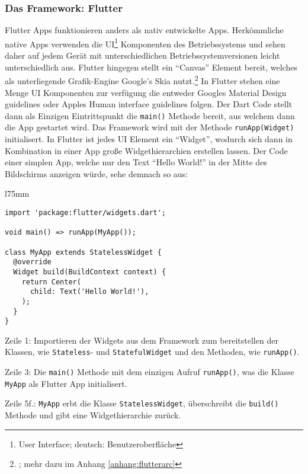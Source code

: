 \subsubsection{Das Framework: Flutter}

Flutter Apps funktionieren anders als nativ entwickelte Apps. Herkömmliche native Apps verwenden die UI\footnote{User Interface; deutsch: Benutzeroberfläche} Komponenten des Betriebssystems und sehen daher auf jedem Gerät mit unterschiedlichen Betriebssystemversionen leicht unterschiedlich aus. Flutter hingegen stellt ein "`Canvas"' Element bereit, welches als unterliegende Grafik-Engine Google's Skia nutzt.\footnote{\cite{flutterarchitecture}; mehr dazu im Anhang \ref{anhang:flutterarc}} In Flutter stehen eine Menge UI Komponenten zur verfügung die entweder Googles Material Design guidelines oder Apples Human interface guidelines folgen. Der Dart Code stellt dann als Einzigen Eintrittspunkt die \texttt{main()} Methode bereit, aus welchem dann die App gestartet wird. Das Framework wird mit der Methode \texttt{runApp(Widget)} initialisert. In Flutter ist jedes UI Element ein "`Widget"', wodurch sich dann in Kombination in einer App große Widgethierarchien erstellen lassen. Der Code einer simplen App, welche nur den Text "`Hello World!"' in der Mitte des Bildschirms anzeigen würde, sehe demnach so aus:

\begin{wrapfigure}{l}{75mm}
  \begin{verbatim}
import 'package:flutter/widgets.dart';

void main() => runApp(MyApp());

class MyApp extends StatelessWidget {
  @override
  Widget build(BuildContext context) {
    return Center(
      child: Text('Hello World!'),
    );
  }
}
\end{verbatim}
\end{wrapfigure}

Zeile 1: Importieren der Widgets aus dem Framework zum bereitstellen der Klassen, wie \texttt{Stateless}- und \texttt{StatefulWidget} und den Methoden, wie \texttt{runApp()}.

Zeile 3: Die \texttt{main()} Methode mit dem einzigen Aufruf \texttt{runApp()}, was die Klasse \texttt{MyApp} als Flutter App initialisert.

Zeile 5f.: \texttt{MyApp} erbt die Klasse \texttt{StatelessWidget}, überschreibt die \texttt{build()} Methode und gibt eine Widgethierarchie zurück.

